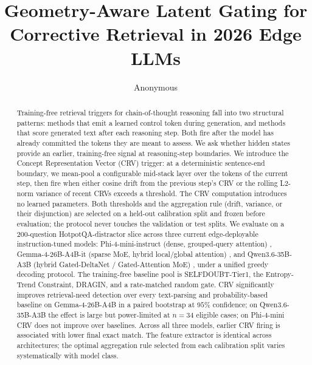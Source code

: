 \documentclass[11pt]{article}
\title{Geometry-Aware Latent Gating for Corrective Retrieval in 2026 Edge LLMs}
\author{Anonymous}
\begin{document}
\maketitle

\begin{abstract}
Training-free retrieval triggers for chain-of-thought reasoning fall into two structural patterns: methods that emit a learned control token during generation, and methods that score generated text after each reasoning step. Both fire after the model has already committed the tokens they are meant to assess. We ask whether hidden states provide an earlier, training-free signal at reasoning-step boundaries. We introduce the Concept Representation Vector (CRV) trigger: at a deterministic sentence-end boundary, we mean-pool a configurable mid-stack layer over the tokens of the current step, then fire when either cosine drift from the previous step's CRV or the rolling L2-norm variance of recent CRVs exceeds a threshold. The CRV computation introduces no learned parameters. Both thresholds and the aggregation rule (drift, variance, or their disjunction) are selected on a held-out calibration split and frozen before evaluation; the protocol never touches the validation or test splits. We evaluate on a 200-question HotpotQA-distractor slice across three current edge-deployable instruction-tuned models: Phi-4-mini-instruct (dense, grouped-query attention) \cite{microsoft_phi4mini_card_2025}, Gemma-4-26B-A4B-it (sparse MoE, hybrid local/global attention) \cite{google_gemma4_26b_card_2026}, and Qwen3.6-35B-A3B (hybrid Gated-DeltaNet / Gated-Attention MoE) \cite{qwen_qwen3p6_35b_card_2026}, under a unified greedy decoding protocol. The training-free baseline pool is SELFDOUBT-Tier1, the Entropy-Trend Constraint, DRAGIN, and a rate-matched random gate. CRV significantly improves retrieval-need detection over every text-parsing and probability-based baseline on Gemma-4-26B-A4B in a paired bootstrap at $95\%$ confidence; on Qwen3.6-35B-A3B the effect is large but power-limited at $n=34$ eligible cases; on Phi-4-mini CRV does not improve over baselines. Across all three models, earlier CRV firing is associated with lower final exact match. The feature extractor is identical across architectures; the optimal aggregation rule selected from each calibration split varies systematically with model class.
\end{abstract}
\end{document}
